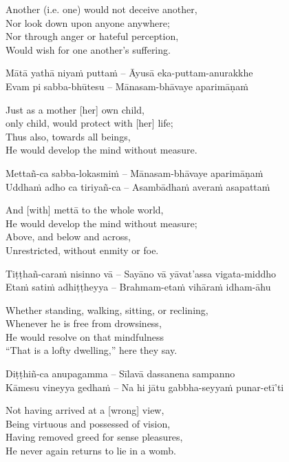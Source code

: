 \begin{english}
  Another (i.e. one) would not deceive another,\\
  Nor look down upon anyone anywhere;\\
  Nor through anger or hateful perception,\\
  Would wish for one another's suffering.
\end{english}

Mātā yathā niyaṁ puttaṁ – Āyusā eka-puttam-anurakkhe\\
Evam pi sabba-bhūtesu – Mānasam-bhāvaye aparimāṇaṁ

\begin{english}
  Just as a mother [her] own child,\\\relax
  [Her] only child, would protect with [her] life; \\
  Thus also, towards all beings,\\
  He would develop the mind without measure.
\end{english}

Mettañ-ca sabba-lokasmiṁ – Mānasam-bhāvaye aparimāṇaṁ\\
Uddhaṁ adho ca tiriyañ-ca – Asambādhaṁ averaṁ asapattaṁ

\begin{english}
  And [with] mettā to the whole world,\\
  He would develop the mind without measure;\\
  Above, and below and across,\\
  Unrestricted, without enmity or foe.
\end{english}

Tiṭṭhañ-caraṁ nisinno vā – Sayāno vā yāvat'assa vigata-middho\\
Etaṁ satiṁ adhiṭṭheyya – Brahmam-etaṁ vihāraṁ idham-āhu

\begin{english}
  Whether standing, walking, sitting, or reclining,\\
  Whenever he is free from drowsiness,\\
  He would resolve on that mindfulness\\
  ``That is a lofty dwelling,'' here they say.
\end{english}

Diṭṭhiñ-ca anupagamma – Sīlavā dassanena sampanno\\
Kāmesu vineyya gedhaṁ – Na hi jātu gabbha-seyyaṁ punar-etī'ti

\begin{english}
  Not having arrived at a [wrong] view,\\
  Being virtuous and possessed of vision,\\
  Having removed greed for sense pleasures,\\
  He never again returns to lie in a womb.
\end{english}

